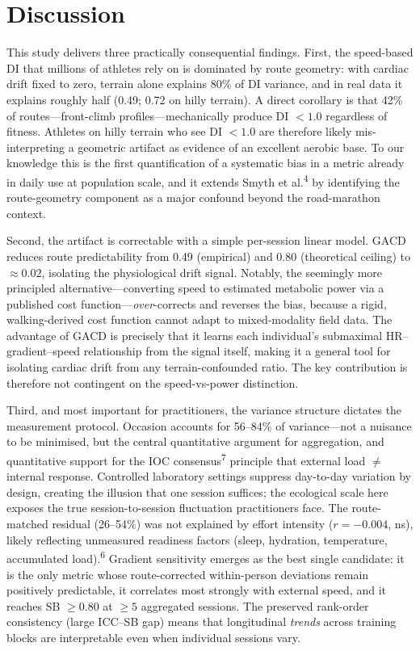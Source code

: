 \documentclass[12pt]{article}
\begin{document}
\section{Discussion}
This study delivers three practically consequential findings. First, the
speed-based DI that millions of athletes rely on is dominated by route
geometry: with cardiac drift fixed to zero, terrain alone explains 80\% of
DI variance, and in real data it explains roughly half (0.49; 0.72 on
hilly terrain). A direct corollary is that 42\% of routes---front-climb
profiles---mechanically produce DI $< 1.0$ regardless of fitness. Athletes
on hilly terrain who see DI $< 1.0$ are therefore likely mis-interpreting
a geometric artifact as evidence of an excellent aerobic base. To our
knowledge this is the first quantification of a systematic bias in a
metric already in daily use at population scale, and it extends Smyth et
al.\textsuperscript{4} by identifying the route-geometry component as a
major confound beyond the road-marathon context.

Second, the artifact is correctable with a simple per-session linear
model. GACD reduces route predictability from 0.49 (empirical) and 0.80
(theoretical ceiling) to $\approx 0.02$, isolating the physiological drift
signal. Notably, the seemingly more principled alternative---converting
speed to estimated metabolic power via a published cost
function---\emph{over}-corrects and reverses the bias, because a rigid,
walking-derived cost function cannot adapt to mixed-modality field data.
The advantage of GACD is precisely that it learns each individual's
submaximal HR--gradient--speed relationship from the signal itself, making
it a general tool for isolating cardiac drift from any terrain-confounded
ratio. The key contribution is therefore not contingent on the
speed-vs-power distinction.

Third, and most important for practitioners, the variance structure
dictates the measurement protocol. Occasion accounts for 56--84\% of
variance---not a nuisance to be minimised, but the central quantitative
argument for aggregation, and quantitative support for the IOC
consensus\textsuperscript{7} principle that external load $\neq$ internal
response. Controlled laboratory settings suppress day-to-day variation by
design, creating the illusion that one session suffices; the ecological
scale here exposes the true session-to-session fluctuation practitioners
face. The route-matched residual (26--54\%) was not explained by effort
intensity ($r = -0.004$, ns), likely reflecting unmeasured readiness
factors (sleep, hydration, temperature, accumulated
load).\textsuperscript{6} Gradient sensitivity emerges as the best single
candidate: it is the only metric whose route-corrected within-person
deviations remain positively predictable, it correlates most strongly with
external speed, and it reaches SB $\geq 0.80$ at $\geq 5$ aggregated
sessions. The preserved rank-order consistency (large ICC--SB gap) means
that longitudinal \emph{trends} across training blocks are interpretable
even when individual sessions vary.
\end{document}
